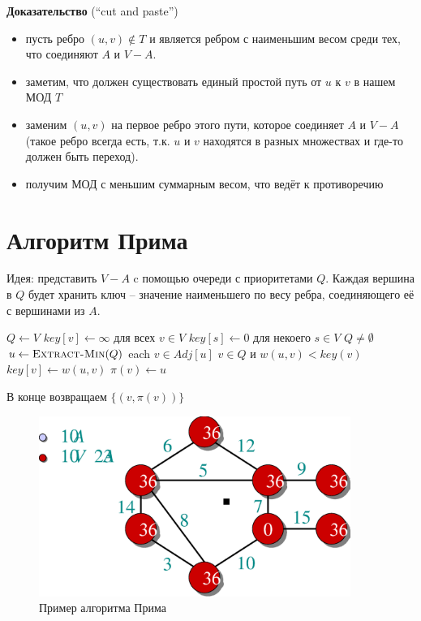 \documentclass[a4paper,11pt]{article}
\begin{document}
\textbf{Доказательство} (``cut and paste'')
\begin{itemize}
  
\item пусть ребро $(u, v) \notin T$ и является ребром с наименьшим весом среди тех,
что соединяют $A$ и $V-A$.
\item заметим, что должен существовать единый простой путь от $u$ к $v$ в нашем
  МОД $T$
\item заменим $(u, v)$ на первое ребро этого пути, которое соединяет $A$ и $V -
  A$ (такое ребро всегда есть, т.к. $u$ и $v$ находятся в разных множествах и
  где-то должен быть переход).
\item получим МОД с меньшим суммарным весом, что ведёт к противоречию
\end{itemize}

\section{Алгоритм Прима}

Идея: представить $V - A$ c помощью очереди с приоритетами $Q$. Каждая вершина в
$Q$ будет хранить ключ -- значение наименьшего по весу ребра, соединяющего её с
вершинами из $A$.

\begin{codebox}
\li $Q \gets V $
\li $key[v] \gets \infty$ для всех $v \in V$
\li $key[s] \gets 0$ для некоего $s \in V$
\li \While $Q \neq \emptyset$
\li \Do $u \gets \textnormal{\scshape Extract-Min}(Q)$
\li \For each $v \in Adj[u]$
\li \Do \If $v \in Q$ и $w(u, v) < key(v)$
\li \Then $key[v] \gets w(u,v)$
\li $\pi(v) \gets u$
  \End
  \End
  \End
\end{codebox}

В конце возвращаем $\{ (v, \pi(v))\}$

\begin{figure}[ht]
  \centering
  \includegraphics[width=4in]{lecture16/prim1.eps}
  \caption{Пример алгоритма Прима}
\end{figure}
\end{document}
